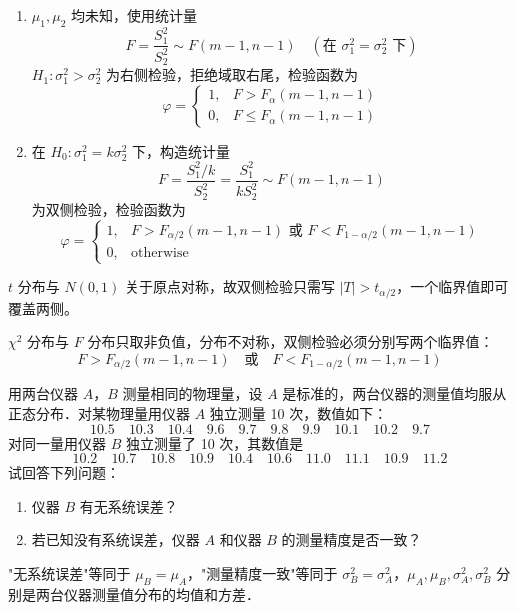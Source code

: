 \begin{solution}
\begin{enumerate}
    \item[(1)] $\mu_1, \mu_2$ 均未知，使用统计量
    \[
    F = \frac{S_1^2}{S_2^2} \sim F(m-1, n-1) \quad (\text{在 } \sigma_1^2 = \sigma_2^2 \text{ 下})
    \]
    $H_1: \sigma_1^2 > \sigma_2^2$ 为右侧检验，拒绝域取右尾，检验函数为
    \[
    \varphi = \begin{cases} 1, & F > F_{\alpha}(m-1, n-1) \\ 0, & F \leqslant F_{\alpha}(m-1, n-1) \end{cases}
    \]

    \item[(2)] 在 $H_0: \sigma_1^2 = k\sigma_2^2$ 下，构造统计量
    \[
    F = \frac{S_1^2 / k}{S_2^2} = \frac{S_1^2}{k S_2^2} \sim F(m-1, n-1)
    \]
    为双侧检验，检验函数为
    \[
    \varphi = \begin{cases} 1, & F > F_{\alpha/2}(m-1, n-1) \text{ 或 } F < F_{1-\alpha/2}(m-1, n-1) \\ 0, & \text{otherwise} \end{cases}
    \]
\end{enumerate}
\end{solution}
\begin{dxtips}
   
$t$ 分布与 $N(0,1)$ 关于原点对称，故双侧检验只需写 $|T| > t_{\alpha/2}$，一个临界值即可覆盖两侧。

$\chi^2$ 分布与 $F$ 分布只取非负值，分布不对称，双侧检验必须分别写两个临界值：
$$F > F_{\alpha/2}(m-1,n-1) \quad \text{或} \quad F < F_{1-\alpha/2}(m-1,n-1)$$

\end{dxtips}
\begin{homework}[6]
用两台仪器 $A$，$B$ 测量相同的物理量，设 $A$ 是标准的，两台仪器的测量值均服从正态分布．对某物理量用仪器 $A$ 独立测量 10 次，数值如下：
\[
10.5 \quad 10.3 \quad 10.4 \quad 9.6 \quad 9.7 \quad 9.8 \quad 9.9 \quad 10.1 \quad 10.2 \quad 9.7
\]
对同一量用仪器 $B$ 独立测量了 10 次，其数值是
\[
10.2 \quad 10.7 \quad 10.8 \quad 10.9 \quad 10.4 \quad 10.6 \quad 11.0 \quad 11.1 \quad 10.9 \quad 11.2
\]
试回答下列问题：

\begin{enumerate}
    \item[(1)] 仪器 $B$ 有无系统误差？

    \item[(2)] 若已知没有系统误差，仪器 $A$ 和仪器 $B$ 的测量精度是否一致？
\end{enumerate}

\begin{note}
"无系统误差"等同于 $\mu_B = \mu_A$，"测量精度一致"等同于 $\sigma_B^2 = \sigma_A^2$，$\mu_A, \mu_B, \sigma_A^2, \sigma_B^2$ 分别是两台仪器测量值分布的均值和方差．
\end{note}
\end{homework}
